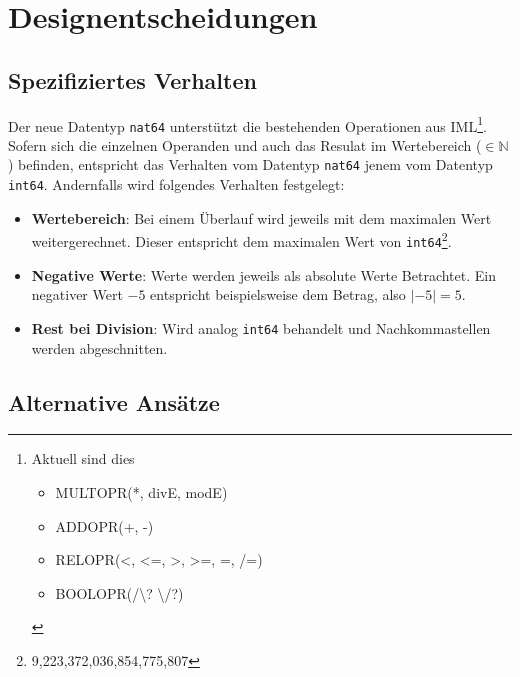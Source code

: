 \documentclass[10pt, a4paper, twocolumn]{article} %
\begin{document}
\section{Designentscheidungen}
\subsection{Spezifiziertes Verhalten}
Der neue Datentyp \texttt{nat64} unterstützt die bestehenden Operationen aus IML\footnote{Aktuell sind dies \begin{itemize} \item MULTOPR(*, divE, modE) \item ADDOPR(+, -) \item RELOPR(<, <=, >, >=, =, /=) \item BOOLOPR(/\textbackslash? \textbackslash/?)\end{itemize}}.
Sofern sich die einzelnen Operanden und auch das Resulat im Wertebereich ($\in \mathbb{N}$) befinden, %
entspricht das Verhalten vom Datentyp \texttt{nat64} jenem vom Datentyp \texttt{int64}.
Andernfalls wird folgendes Verhalten festgelegt:

\begin{itemize} %
    \item \textbf{Wertebereich}: Bei einem Überlauf wird jeweils mit dem maximalen Wert weitergerechnet. Dieser entspricht dem maximalen Wert von \texttt{int64}\footnote{9,223,372,036,854,775,807}.
    \item \textbf{Negative Werte}: Werte werden jeweils als absolute Werte Betrachtet. Ein negativer Wert $-5$ entspricht beispielsweise dem Betrag, also $|-5| = 5$.
    \item \textbf{Rest bei Division}: Wird analog \texttt{int64} behandelt und Nachkommastellen werden abgeschnitten.
\end{itemize}

\subsection{Alternative Ansätze}

\end{document}
